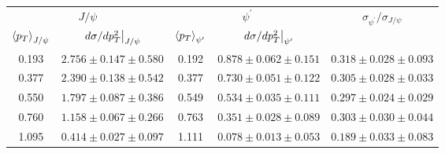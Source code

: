 \begin{tabular}{cc|cc|c}
\hline
\multicolumn{2}{c|}{$J/\psi$} &
  \multicolumn{2}{c|}{$\psi^{\prime}$} &
  \multirow{2}{*}{$\sigma_{\psi^\prime}/\sigma_{J/\psi}$} \\ \cline{1-4}
$\expval{p_T}_{J/\psi}$ &
  $\eval{d\sigma/dp^2_T}_{J/\psi}$ &
  $\expval{p_T}_{\psi^\prime}$ &
  $\eval{d\sigma/dp^2_T}_{\psi^\prime}$ &
   \\ \hline
0.193 & $2.756\pm0.147\pm0.580$ & 0.192 & $0.878\pm0.062\pm0.151$ & $0.318\pm0.028\pm0.093$ \\
0.377 & $2.390\pm0.138\pm0.542$ & 0.377 & $0.730\pm0.051\pm0.122$ & $0.305\pm0.028\pm0.033$ \\
0.550 & $1.797\pm0.087\pm0.386$ & 0.549 & $0.534\pm0.035\pm0.111$ & $0.297\pm0.024\pm0.029$ \\
0.760 & $1.158\pm0.067\pm0.266$ & 0.763 & $0.351\pm0.028\pm0.089$ & $0.303\pm0.030\pm0.044$ \\
1.095 & $0.414\pm0.027\pm0.097$ & 1.111 & $0.078\pm0.013\pm0.053$ & $0.189\pm0.033\pm0.083$ \\ \hline
\end{tabular}
